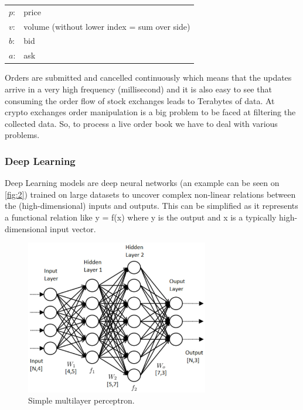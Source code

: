 \documentclass[11pt,a4paper,oneside]{article}
\begin{document}
  \begin{center}
    \begin{tabular}{l l}
      $p$: & price \\
      $v$: & volume (without lower index = sum over side) \\
      $b$: & bid \\
      $a$: & ask
    \end{tabular}
  \end{center}

  Orders are submitted and cancelled continuously which means that the updates arrive in a very high frequency 
  (millisecond) and it is also easy to see that consuming the order flow of stock exchanges leads to Terabytes of data. 
  At crypto exchanges order manipulation is a big problem to be faced at filtering the collected data. So, to process a 
  live order book we have to deal with various problems.

  \subsubsection{Deep Learning}
  \label{sec:deep_learning}

  Deep Learning models are deep neural networks (an example can be seen on \autoref{fig:2}) trained on large datasets to 
  uncover complex non-linear relations between the (high-dimensional) inputs and outputs. This can be simplified as it 
  represents a functional relation like y = f(x) where y is the output and x is a typically high-dimensional input 
  vector.

  \begin{figure}[tbh]
    \centering
    \includegraphics[width=8cm]{mlp.png}
    \caption[Simple multilayer perceptron.]{Simple multilayer perceptron.\footnotemark} 
    \label{fig:2}
  \end{figure}
\end{document}

